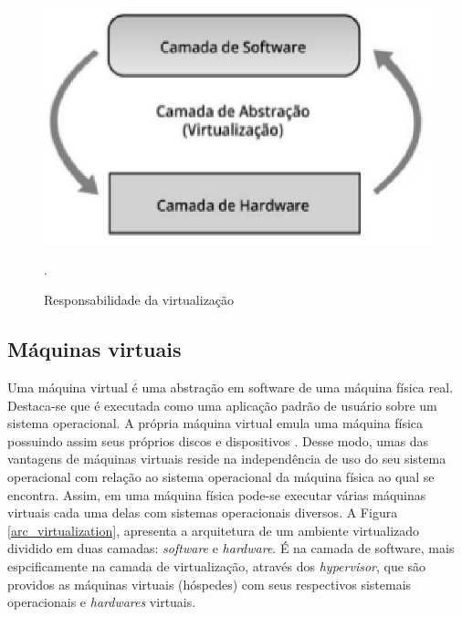 \begin{figure}[!htb]
\centering
\includegraphics [keepaspectratio=true,scale=0.60]{figuras/virtualization_role.eps}
\caption{Responsabilidade da virtualização}
\cite{manoel}.
\label{virtualization_role}
\end{figure}

\subsection{Máquinas virtuais}
Uma máquina virtual é uma abstração em software de uma máquina física real. Destaca-se que é executada como uma aplicação padrão de usuário sobre um sistema operacional. A própria máquina virtual emula uma máquina física possuindo assim seus próprios discos e dispositivos \cite{mcewan}. Desse modo, umas das vantagens de máquinas virtuais reside na independência de uso do seu sistema operacional com relação ao sistema operacional da máquina física ao qual se encontra. Assim, em uma máquina física pode-se executar várias máquinas virtuais cada uma delas com sistemas operacionais diversos. A Figura \ref{arc_virtualization}, apresenta a arquitetura de um ambiente virtualizado dividido em duas camadas: \textit{software} e \textit{hardware}. É na camada de software, mais espcificamente na camada de virtualização, através dos \textit{hypervisor}, que são providos as máquinas virtuais (hóspedes) com seus respectivos sistemais operacionais e \textit{hardwares} virtuais.  

